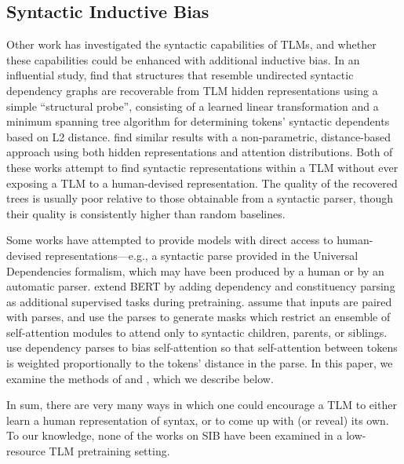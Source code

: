 \documentclass[11pt]{article}
\begin{document}
\subsection{Syntactic Inductive Bias}\label{sec:sib}
Other work has investigated the syntactic capabilities of TLMs, and whether these capabilities could be enhanced with additional inductive bias.
In an influential study, \citet{hewitt_structural_2019} find that structures that resemble undirected syntactic dependency graphs are recoverable from TLM hidden representations using a simple ``structural probe'', consisting of a learned linear transformation and a minimum spanning tree algorithm for determining tokens' syntactic dependents based on L2 distance.
\citet{DBLP:conf/iclr/KimCEL20} find similar results with a non-parametric, distance-based approach using both hidden representations and attention distributions. 
Both of these works attempt to find syntactic representations within a TLM without ever exposing a TLM to a human-devised representation.
The quality of the recovered trees is usually poor relative to those obtainable from a syntactic parser, though their quality is consistently higher than random baselines.

Some works have attempted to provide models with direct access to human-devised representations---e.g., a syntactic parse provided in the Universal Dependencies formalism, which may have been produced by a human or by an automatic parser.
\citet{zhou_limit-bert_2020} extend BERT by adding dependency and constituency parsing as additional supervised tasks during pretraining.
\citet{bai_pre-train_2021} assume that inputs are paired with parses, and use the parses to generate masks which restrict an ensemble of self-attention modules to attend only to syntactic children, parents, or siblings.
\citet{xu-etal-2021-syntax} use dependency parses to bias self-attention so that self-attention between tokens is weighted proportionally to the tokens' distance in the parse.
In this paper, we examine the methods of \citet{li-etal-2021-improving-bert} and \citet{zhang-etal-2022-syntax}, which we describe below.

In sum, there are very many ways in which one could encourage a TLM to either learn a human representation of syntax, or to come up with (or reveal) its own.
To our knowledge, none of the works on SIB have been examined in a low-resource TLM pretraining setting.
\end{document}
